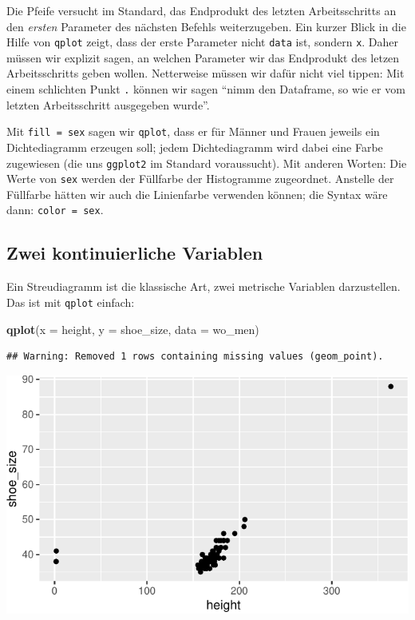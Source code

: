 \documentclass[12pt,ngerman,paper=a4,pagesize,DIV=13]{scrreprt}
\newenvironment{Shaded}{\begin{snugshade}}{\end{snugshade}}
\newcommand{\DataTypeTok}[1]{\textcolor[rgb]{0.13,0.29,0.53}{#1}}
\newcommand{\KeywordTok}[1]{\textcolor[rgb]{0.13,0.29,0.53}{\textbf{#1}}}
\newcommand{\NormalTok}[1]{#1}
\begin{document}
Die Pfeife versucht im Standard, das Endprodukt des letzten
Arbeitsschritts an den \emph{ersten} Parameter des nächsten Befehls
weiterzugeben. Ein kurzer Blick in die Hilfe von \texttt{qplot} zeigt,
dass der erste Parameter nicht \texttt{data} ist, sondern \texttt{x}.
Daher müssen wir explizit sagen, an welchen Parameter wir das Endprodukt
des letzen Arbeitsschritts geben wollen. Netterweise müssen wir dafür
nicht viel tippen: Mit einem schlichten Punkt \texttt{.} können wir
sagen \enquote{nimm den Dataframe, so wie er vom letzten Arbeitsschritt
ausgegeben wurde}.

Mit \texttt{fill\ =\ sex} sagen wir \texttt{qplot}, dass er für Männer
und Frauen jeweils ein Dichtediagramm erzeugen soll; jedem
Dichtediagramm wird dabei eine Farbe zugewiesen (die uns
\texttt{ggplot2} im Standard voraussucht). Mit anderen Worten: Die Werte
von \texttt{sex} werden der Füllfarbe der Histogramme zugeordnet.
Anstelle der Füllfarbe hätten wir auch die Linienfarbe verwenden können;
die Syntax wäre dann: \texttt{color\ =\ sex}.

\hypertarget{zwei-kontinuierliche-variablen}{%
\subsection{Zwei kontinuierliche
Variablen}\label{zwei-kontinuierliche-variablen}}

Ein Streudiagramm ist die klassische Art, zwei metrische Variablen
darzustellen. Das ist mit \texttt{qplot} einfach:

\begin{Shaded}
\begin{Highlighting}[]
\KeywordTok{qplot}\NormalTok{(}\DataTypeTok{x =}\NormalTok{ height, }\DataTypeTok{y =}\NormalTok{ shoe_size, }\DataTypeTok{data =}\NormalTok{ wo_men)}
\end{Highlighting}
\end{Shaded}

\begin{verbatim}
## Warning: Removed 1 rows containing missing values (geom_point).
\end{verbatim}

\includegraphics{DatenerhebungStatistik-Uebung_files/figure-latex/unnamed-chunk-245-1.pdf}
\end{document}
